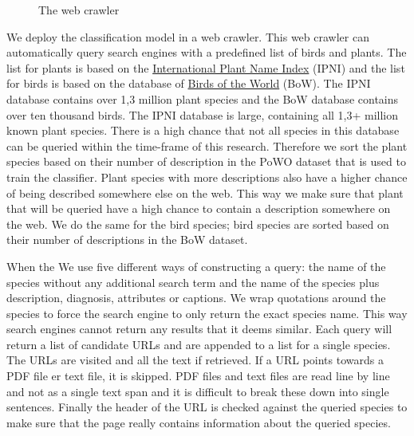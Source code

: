 \documentclass[a4paper, 12pt, oneside]{book} %
\begin{document}
\begin{figure} [h!]
    \centering
    \caption[Web Crawler]{The web crawler}
    \label{fig:webcrawler}
\end{figure}

We deploy the classification model in a web crawler.
This web crawler can automatically query search engines with a predefined list of birds and plants.
The list for plants is based on the \href{https://www.ipni.org/}{International Plant Name Index} (IPNI) and the list for birds is based on the database of \href{https://birdsoftheworld.org/bow/home}{Birds of the World} (BoW).
The IPNI database contains over 1,3 million plant species and the BoW database contains over ten thousand birds.
The IPNI database is large, containing all 1,3+ million known plant species.
There is a high chance that not all species in this database can be queried within the time-frame of this research.
Therefore we sort the plant species based on their number of description in the PoWO dataset that is used to train the classifier.
Plant species with more descriptions also have a higher chance of being described somewhere else on the web.
This way we make sure that plant that will be queried have a high chance to contain a description somewhere on the web.
We do the same for the bird species; bird species are sorted based on their number of descriptions in the BoW dataset.

When the
We use five different ways of constructing a query: the name of the species without any additional search term and the name of the species plus description, diagnosis, attributes or captions.
We wrap quotations around the species to force the search engine to only return the exact species name. 
This way search engines cannot return any results that it deems similar.
Each query will return a list of candidate URLs and are appended to a list for a single species.
The URLs are visited and all the text if retrieved.
If a URL points towards a PDF file er text file, it is skipped.
PDF files and text files are read line by line and not as a single text span and it is difficult to break these down into single sentences. 
Finally the header of the URL is checked against the queried species to make sure that the page really contains information about the queried species.
\end{document}

